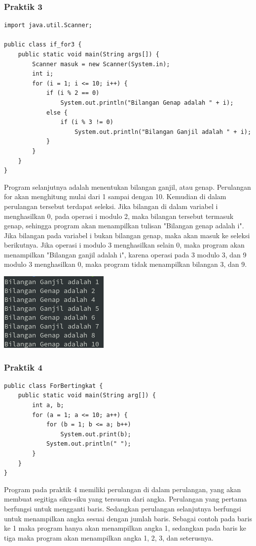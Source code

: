 \documentclass[a4paper,12pt]{article}
\begin{document}
\subsubsection{Praktik 3}
\begin{lstlisting}
import java.util.Scanner;

public class if_for3 {
    public static void main(String args[]) {
        Scanner masuk = new Scanner(System.in);
        int i;
        for (i = 1; i <= 10; i++) {
            if (i % 2 == 0)
                System.out.println("Bilangan Genap adalah " + i);
            else {
                if (i % 3 != 0)
                    System.out.println("Bilangan Ganjil adalah " + i);
            }
        }
    }
}
\end{lstlisting}
Program selanjutnya adalah menentukan bilangan ganjil, atau genap. Perulangan for akan menghitung mulai dari 1 sampai
dengan 10. Kemudian di dalam perulangan tersebut terdapat seleksi. Jika bilangan di dalam variabel i menghasilkan 0,
pada operasi i modulo 2, maka bilangan tersebut termasuk genap, sehingga program akan menampilkan tulisan "Bilangan
genap adalah i". Jika bilangan pada variabel i bukan bilangan genap, maka akan masuk ke seleksi berikutnya. Jika operasi
i modulo 3 menghasilkan selain 0, maka program akan menampilkan "Bilangan ganjil adalah i", karena operasi pada 3 modulo
3, dan 9 modulo 3 menghasilkan 0, maka program tidak menampilkan bilangan 3, dan 9.
\begin{center}
    \includegraphics[scale=.8]{3.png}
\end{center}

\subsubsection{Praktik 4}
\begin{lstlisting}
public class ForBertingkat {
    public static void main(String arg[]) {
        int a, b;
        for (a = 1; a <= 10; a++) {
            for (b = 1; b <= a; b++)
                System.out.print(b);
            System.out.println(" ");
        }
    }
}
\end{lstlisting}
Program pada praktik 4 memiliki perulangan di dalam perulangan, yang akan membuat segitiga siku-siku yang tersusun dari
angka. Perulangan yang pertama berfungsi untuk mengganti baris. Sedangkan perulangan selanjutnya berfungsi untuk
menampilkan angka sesuai dengan jumlah baris. Sebagai contoh pada baris ke 1 maka program hanya akan menampilkan angka
1, sedangkan pada baris ke tiga maka program akan menampilkan angka 1, 2, 3, dan seterusnya.
\end{document}
